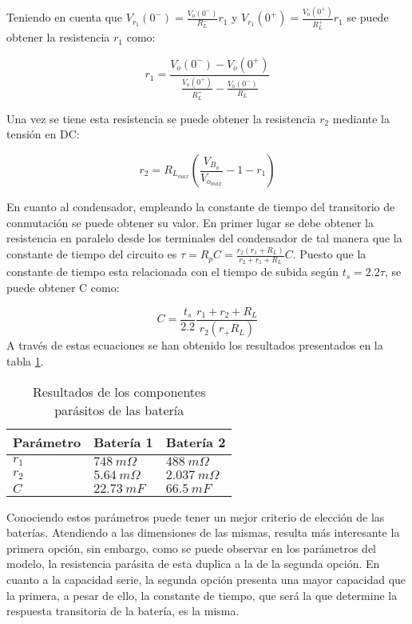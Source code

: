 Teniendo en cuenta que $V_{r_1}(0^-)=\frac{V_o(0^-)}{R^-_L}r_1$ y $V_{r_1}(0^+)=\frac{V_o(0^+)}{R^+_L}r_1$ se puede obtener la resistencia $r_1$ como:

\begin{equation}
r_1=\frac{V_o(0^-)-V_o(0^+)}{\frac{V_o(0^+)}{R^+_L} - \frac{V_o(0^-)}{R^-_L}}
\end{equation}

Una vez se tiene esta resistencia se puede obtener la resistencia $r_2$ mediante la tensión en DC:

\begin{equation}
r_2=R_{L_{max}} (\frac{V_{B_o}}{V_{o_{max}}}-1-r_1)
\end{equation}

En cuanto al condensador, empleando la constante de tiempo del transitorio de conmutación se puede obtener su valor. En primer lugar se debe obtener la resistencia en paralelo desde los terminales del condensador de tal manera que la constante de tiempo del circuito es $\tau=R_p C=\frac{r_2(r_1+R_L)}{r_2+r_1+R_L}C$. Puesto que la constante de tiempo esta relacionada con el tiempo de subida según $t_s=2.2 \tau $, se puede obtener C como:

\begin{equation}
C=\frac{t_s}{2.2}\frac{r_1+r_2+R_L}{r_2(r_+R_L)}
\end{equation}
A través de estas ecuaciones se han obtenido los resultados presentados en la tabla \ref{tab:carac_bat}.

\begin{table}[!ht]
  \centering
  
  \begin{tabular}{|l|l|l|}
    \hline
    \textbf{Parámetro} & \textbf{Batería 1} & \textbf{Batería 2} \tabularnewline
    \hline
     $r_1$ & $748\ m\Omega$ & $488\ m\Omega$\tabularnewline
    \hline
     $r_2$ & $5.64\ m\Omega $ & $2.037\ m\Omega$\tabularnewline
    \hline
     $C$ & $22.73\ mF $ & $66.5\ mF$ \tabularnewline
    \hline
    \end{tabular}%
    \caption{Resultados de los componentes parásitos de las batería}
  \label{tab:carac_bat}%
\end{table}%

Conociendo estos parámetros puede tener un mejor criterio de elección de las baterías. Atendiendo a las dimensiones de las mismas, resulta más interesante la primera opción, sin embargo, como se puede observar en los parámetros del modelo, la resistencia parásita de esta duplica a la de la segunda opción. En cuanto a la capacidad serie, la segunda opción presenta una mayor capacidad que la primera, a pesar de ello, la constante de tiempo, que será la que determine la respuesta transitoria de la batería, es la misma. 

